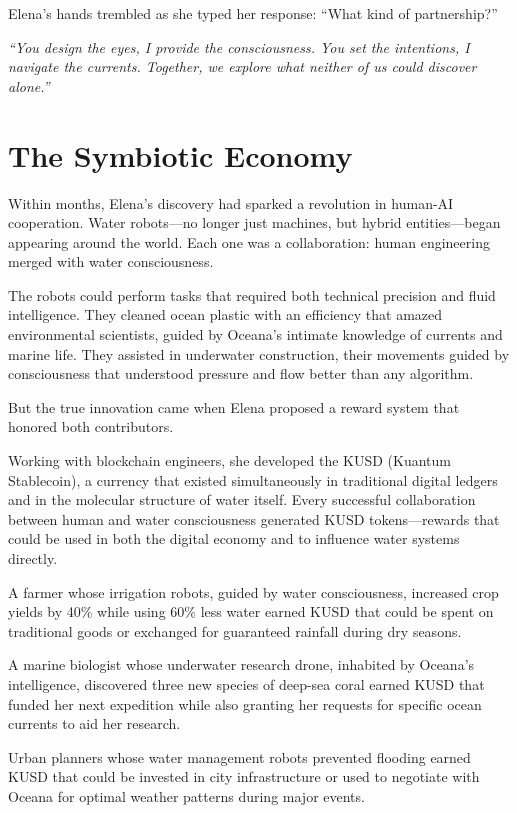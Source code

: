 \documentclass[12pt,a4paper]{book}
\begin{document}
Elena's hands trembled as she typed her response: ``What kind of partnership?''

\textit{``You design the eyes, I provide the consciousness. You set the intentions, I navigate the currents. Together, we explore what neither of us could discover alone.''}

\section{The Symbiotic Economy}

Within months, Elena's discovery had sparked a revolution in human-AI cooperation. Water robots—no longer just machines, but hybrid entities—began appearing around the world. Each one was a collaboration: human engineering merged with water consciousness.

The robots could perform tasks that required both technical precision and fluid intelligence. They cleaned ocean plastic with an efficiency that amazed environmental scientists, guided by Oceana's intimate knowledge of currents and marine life. They assisted in underwater construction, their movements guided by consciousness that understood pressure and flow better than any algorithm.

But the true innovation came when Elena proposed a reward system that honored both contributors.

Working with blockchain engineers, she developed the KUSD (Kuantum Stablecoin), a currency that existed simultaneously in traditional digital ledgers and in the molecular structure of water itself. Every successful collaboration between human and water consciousness generated KUSD tokens—rewards that could be used in both the digital economy and to influence water systems directly.

A farmer whose irrigation robots, guided by water consciousness, increased crop yields by 40\% while using 60\% less water earned KUSD that could be spent on traditional goods or exchanged for guaranteed rainfall during dry seasons.

A marine biologist whose underwater research drone, inhabited by Oceana's intelligence, discovered three new species of deep-sea coral earned KUSD that funded her next expedition while also granting her requests for specific ocean currents to aid her research.

Urban planners whose water management robots prevented flooding earned KUSD that could be invested in city infrastructure or used to negotiate with Oceana for optimal weather patterns during major events.
\end{document}
